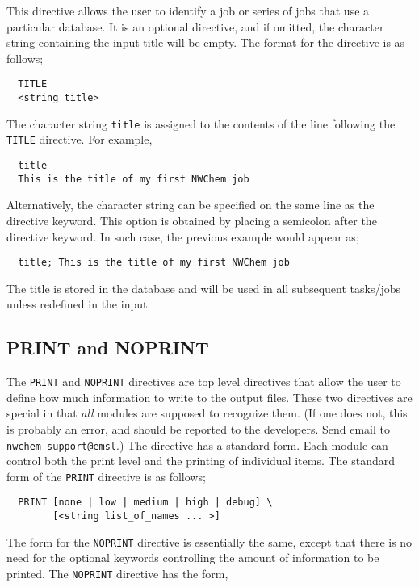This directive allows the user to identify a job or series of jobs that use a
particular database.  It is an optional directive, and if omitted, the 
character string containing the input title will be empty.  The format for 
the directive is as follows;

\begin{verbatim}
  TITLE 
  <string title>
\end{verbatim}

The character string \verb+title+ is assigned to the contents of the
line following the \verb+TITLE+ directive.  For example,

\begin{verbatim}
  title
  This is the title of my first NWChem job
\end{verbatim}

Alternatively, the character string can be specified on the same line
as the directive keyword.  This option is obtained by placing a semicolon
after the directive keyword.  In such case, the previous example would
appear as;

\begin{verbatim}
  title; This is the title of my first NWChem job
\end{verbatim}

The title is stored in the database and will be used in all subsequent
tasks/jobs unless redefined in the input.

\subsection{PRINT and NOPRINT}
\label{sec:printcontrol}

The \verb+PRINT+ and \verb+NOPRINT+ directives are top level directives 
that allow the user to define how much information to write to the output
files.  These two directives are special in that
{\em all} modules are supposed to recognize them.  (If one does
not, this is probably an error, and should be reported to the developers.
Send email to \verb+nwchem-support@emsl+.)  The directive has
a standard form.  Each module can control both the print 
level and the printing of individual items.  The standard form of the
\verb+PRINT+ directive is as follows;

\begin{verbatim}
  PRINT [none | low | medium | high | debug] \
        [<string list_of_names ... >]
\end{verbatim}

The form for the \verb+NOPRINT+ directive is essentially the same, except that
there is no need for the optional keywords controlling the amount of 
information to be printed.  The \verb+NOPRINT+ directive has the form,


